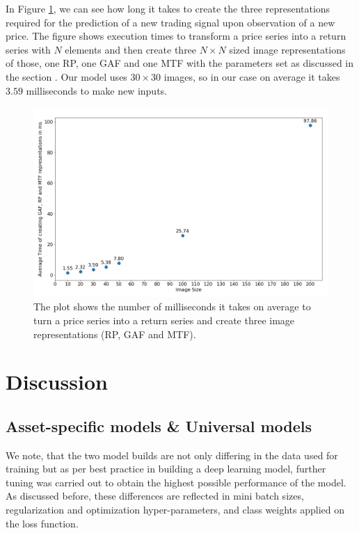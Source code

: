 \documentclass[11pt, a4paper]{article}
\begin{document}
In Figure \ref{fig:imageCrea}, we can see how long it takes to create the three representations required for the prediction of a new trading signal upon observation of a new price. The figure shows execution times to transform a price series into a return series with $N$ elements and then create three $N \times N$ sized image representations of those, one RP, one GAF and one MTF with the parameters set as discussed in the section . Our model uses $30 \times 30$ images, so in our case on average it takes $3.59$ milliseconds to make new inputs. 

\begin{figure}[h]
    \centering
    \includegraphics[width=\textwidth]{images/Image_Trf_Times.png}
    \caption{The plot shows the number of milliseconds it takes on average to turn a price series into a return series and create three image representations (RP, GAF and MTF).}
    \label{fig:imageCrea}
\end{figure}

\section{Discussion}
\label{sec:Discuss}

\subsection{Asset-specific models \& Universal models}

We note, that the two model builds are not only differing in the data used for training but as per best practice in building a deep learning model, further tuning was carried out to obtain the highest possible performance of the model. As discussed before, these differences are reflected in mini batch sizes, regularization and optimization hyper-parameters, and class weights applied on the loss function.
\end{document}
